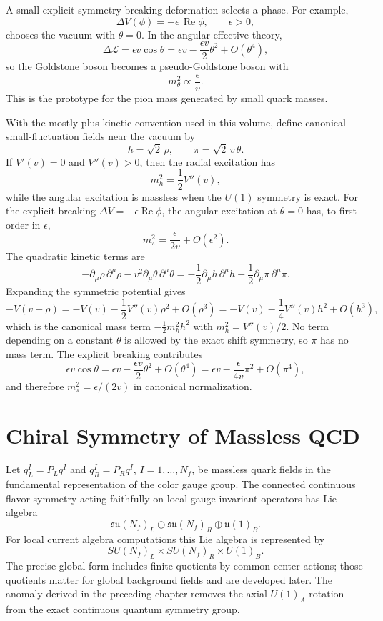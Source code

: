 A small explicit symmetry-breaking deformation selects a phase.  For example,
\[
  \Delta V(\phi)=-\epsilon\,\operatorname{Re}\phi,
  \qquad
  \epsilon>0,
\]
chooses the vacuum with \(\theta=0\).  In the angular effective theory,
\[
  \Delta\mathcal L
  =
  \epsilon v\cos\theta
  =
  \epsilon v-\frac{\epsilon v}{2}\theta^2+O(\theta^4),
\]
so the Goldstone boson becomes a pseudo-Goldstone boson with
\[
  m_\theta^2\propto \frac{\epsilon}{v}.
\]
This is the prototype for the pion mass generated by small quark masses.

\begin{remark}
\label{rem:u1-goldstone-model-masses}
With the mostly-plus kinetic convention used in this volume, define canonical
small-fluctuation fields near the vacuum by
\[
  h=\sqrt2\,\rho,
  \qquad
  \pi=\sqrt2\,v\,\theta .
\]
If \(V'(v)=0\) and \(V''(v)>0\), then the radial excitation has
\[
  m_h^2=\frac12V''(v),
\]
while the angular excitation is massless when the \(U(1)\) symmetry is exact.
For the explicit breaking
\(\Delta V=-\epsilon\operatorname{Re}\phi\), the angular excitation at
\(\theta=0\) has, to first order in \(\epsilon\),
\[
  m_\pi^2=\frac{\epsilon}{2v}+O(\epsilon^2).
\]
The quadratic kinetic terms are
\[
  -\partial_\mu\rho\,\partial^\mu\rho
  -v^2\partial_\mu\theta\,\partial^\mu\theta
  =
  -\frac12\partial_\mu h\,\partial^\mu h
  -\frac12\partial_\mu\pi\,\partial^\mu\pi .
\]
Expanding the symmetric potential gives
\[
  -V(v+\rho)
  =
  -V(v)-\frac12V''(v)\rho^2+O(\rho^3)
  =
  -V(v)-\frac14V''(v)h^2+O(h^3),
\]
which is the canonical mass term
\(-\frac12m_h^2h^2\) with \(m_h^2=V''(v)/2\).  No term depending on a constant
\(\theta\) is allowed by the exact shift symmetry, so \(\pi\) has no mass
term.  The explicit breaking contributes
\[
  \epsilon v\cos\theta
  =
  \epsilon v-\frac{\epsilon v}{2}\theta^2+O(\theta^4)
  =
  \epsilon v-\frac{\epsilon}{4v}\pi^2+O(\pi^4),
\]
and therefore \(m_\pi^2=\epsilon/(2v)\) in canonical normalization.
\end{remark}

\section{Chiral Symmetry of Massless QCD}

Let \(q_L^I=P_Lq^I\) and \(q_R^I=P_Rq^I\), \(I=1,\ldots,N_f\), be massless
quark fields in the fundamental representation of the color gauge group.  The
connected continuous flavor symmetry acting faithfully on local gauge-invariant
operators has Lie algebra
\[
  \mathfrak{su}(N_f)_L\oplus
  \mathfrak{su}(N_f)_R\oplus
  \mathfrak u(1)_B .
\]
For local current algebra computations this Lie algebra is represented by
\[
  SU(N_f)_L\times SU(N_f)_R\times U(1)_B .
\]
The precise global form includes finite quotients by common center actions;
those quotients matter for global background fields and are developed later.
The anomaly derived in the preceding chapter removes the axial \(U(1)_A\)
rotation from the exact continuous quantum symmetry group.


